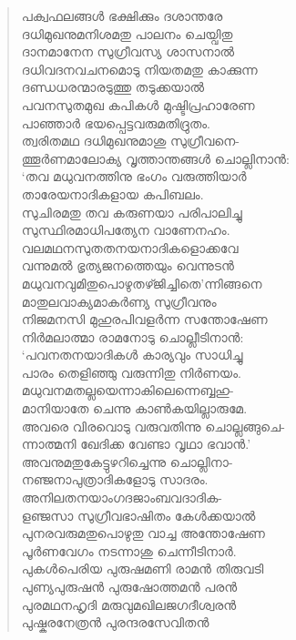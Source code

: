 \begin{verse}
പക്വഫലങ്ങള്‍ ഭക്ഷിക്കും ദശാന്തരേ\\
ദധിമുഖനുമനിശമതു പാലനം ചെയ്വിതു\\
ദാനമാനേന സുഗ്രീവസ്യ ശാസനാല്‍\\
ദധിവദനവചനമൊടു നിയതമതു കാക്കുന്ന\\
ദണ്ഡധരന്മാരടുത്തു തടുക്കയാല്‍\\
പവനസുതമുഖ കപികള്‍ മുഷ്ടിപ്രഹാരേണ\\
പാഞ്ഞാര്‍ ഭയപ്പെട്ടവരുമതിദ്രുതം.\\
ത്വരിതമഥ ദധിമുഖനുമാശു സുഗ്രീവനെ-\\
ത്തൂര്‍ണമാലോക്യ വൃത്താന്തങ്ങള്‍ ചൊല്ലിനാന്‍:\\
‘തവ മധുവനത്തിനു ഭംഗം വരുത്തിയാര്‍\\
താരേയനാദികളായ കപിബലം.\\
സുചിരമതു തവ കരുണയാ പരിപാലിച്ചു\\
സുസ്ഥിരമാധിപത്യേന വാണേനഹം.\\
വലമഥനസുതതനയനാദികളൊക്കവേ\\
വന്നുമല്‍ ഭൃത്യജനത്തെയും വെന്നുടന്‍\\
മധുവനവുമിതുപൊഴുതഴ്ജിച്ചിതെ’ന്നിങ്ങനെ\\
മാതുലവാക്യമാകര്‍ണ്യ സുഗ്രീവനും\\
നിജമനസി മുഹുരപിവളര്‍ന്ന സന്തോഷേണ\\
നിര്‍മലാത്മാ രാമനോടു ചൊല്ലീടിനാന്‍:\\
‘പവനതനയാദികള്‍ കാര്യവും സാധിച്ചു\\
പാരം തെളിഞ്ഞു വരുന്നിതു നിര്‍ണയം.\\
മധുവനമതല്ലയെന്നാകിലെന്നെബ്ബഹു-\\
മാനിയാതേ ചെന്നു കാണ്‍കയില്ലാരുമേ.\\
അവരെ വിരവൊടു വരുവതിന്നു ചൊല്ലങ്ങുചെ-\\
ന്നാത്മനി ഖേദിക്ക വേണ്ടാ വൃഥാ ഭവാന്‍.’\\
അവനുമതുകേട്ടുഴറിച്ചെന്നു ചൊല്ലിനാ-\\
നഞ്ജനാപുത്രാദികളോടു സാദരം.\\
അനിലതനയാംഗദജാംബവദാദിക-\\
ളഞ്ജസാ സുഗ്രീവഭാഷിതം കേള്‍ക്കയാല്‍\\
പുനരവരുമതുപൊഴുതു വാച്ച അന്തോഷേണ\\
പൂര്‍ണവേഗം നടന്നാശു ചെന്നീടിനാര്‍.\\
പുകള്‍പെരിയ പുരുഷമണി രാമന്‍ തിരുവടി\\
പുണ്യപുരുഷന്‍ പുരുഷോത്തമന്‍ പരന്‍\\
പുരമഥനഹൃദി മരുവുമഖിലജഗദീശ്വരന്‍\\
പുഷ്കരനേത്രന്‍ പുരന്ദരസേവിതന്‍\\

\end{verse}
